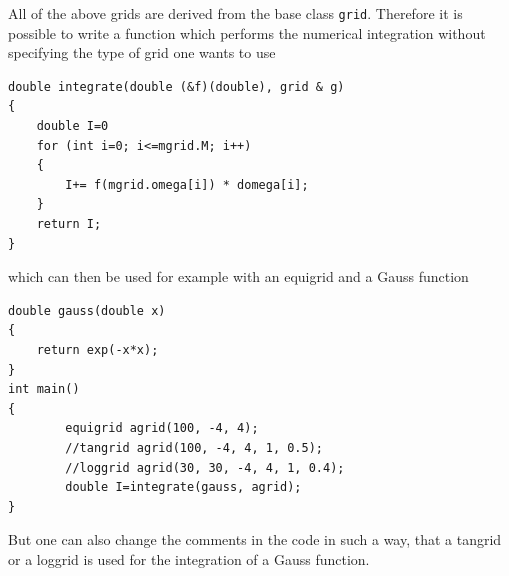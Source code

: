 All of the above grids are derived from the base class \texttt{grid}. Therefore it is possible to write a function which performs the numerical integration without specifying the type of grid one wants to use
\begin{lstlisting}
double integrate(double (&f)(double), grid & g)
{
	double I=0
	for (int i=0; i<=mgrid.M; i++)
	{
		I+= f(mgrid.omega[i]) * domega[i];
	}
	return I;
} 
\end{lstlisting}
which can then be used for example with an equigrid and a Gauss function
\begin{lstlisting}
double gauss(double x)
{
	return exp(-x*x);
}
int main()
{
        equigrid agrid(100, -4, 4);
        //tangrid agrid(100, -4, 4, 1, 0.5);
        //loggrid agrid(30, 30, -4, 4, 1, 0.4);
        double I=integrate(gauss, agrid);
}
\end{lstlisting}
But one can also change the comments in the code in such a way, that a tangrid or a loggrid is used for the integration of a Gauss function.



